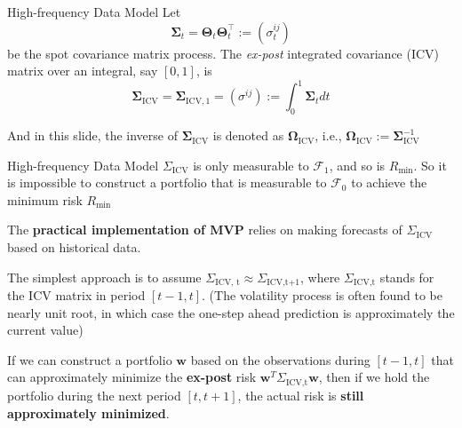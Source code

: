 \documentclass{beamer}
\begin{document}
\begin{frame}{High-frequency Data Model}
Let
$$\boldsymbol{\Sigma}_t=\boldsymbol{\Theta}_t \boldsymbol{\Theta}_t^{\top}:=\left(\sigma_t^{i j}\right)$$
be the spot covariance matrix process. The \textit{ex-post} integrated covariance (ICV) matrix over an integral, say $[0, 1]$, is 
$$\boldsymbol{\Sigma}_{\mathrm{ICV}}=\boldsymbol{\Sigma}_{\mathrm{ICV}, 1}=\left(\sigma^{i j}\right):=\int_0^1 \boldsymbol{\Sigma}_t d t$$

And in this slide, the inverse of $\boldsymbol{\Sigma}_{\mathrm{ICV}}$ is denoted as $\boldsymbol{\Omega}_{\mathrm{ICV}}$, i.e., $\boldsymbol{\Omega}_{\mathrm{ICV}}:=\boldsymbol{\Sigma}_{\mathrm{ICV}}^{-1}$
\end{frame}

\begin{frame}{High-frequency Data Model}
$\Sigma_{\text{ICV}}$ is only measurable to $\mathcal{F}_1$, and so is $R_{\min}$. So it is impossible to construct a portfolio that is measurable to $\mathcal{F}_0$ to achieve the minimum risk $R_{\min}$
\newline

The \textbf{practical implementation of MVP} relies on making forecasts of $\Sigma_{\text{ICV}}$ based on historical data.
\newline

The simplest approach is to assume $\Sigma_{\text{ICV, t}} \approx \Sigma_{\text{ICV,t+1}}$, where $\Sigma_{\text{ICV,t}}$ stands for the ICV matrix in period $[t-1, t]$. (The volatility process is often found to be nearly unit root, in which case the one-step ahead prediction is approximately the current value)

If we can construct a portfolio $\bm{w}$ based on the observations during $[t-1, t]$ that can approximately minimize the \textbf{ex-post} risk $\bm{w}^T\Sigma_{\text{ICV,t}}\bm{w}$, then if we hold the portfolio during the next period $[t, t+1]$, the actual risk is \textbf{still approximately minimized}.
\end{frame}
\end{document}
